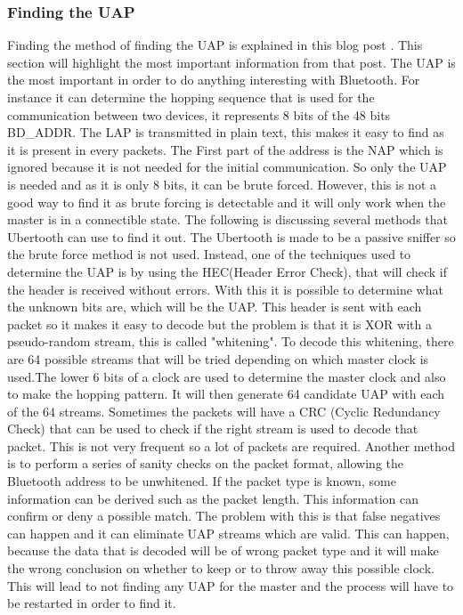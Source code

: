 \subsubsection{Finding the UAP}
\label{subsubsec:finding_uap}
Finding the method of finding the UAP is explained in this blog post \cite{discoveruap}. This section will highlight the most important information from that post. \pend The UAP is the most important in order to do anything interesting with Bluetooth. For instance it can determine the hopping sequence that is used for the communication between two devices, it represents 8 bits of the 48 bits BD\_ADDR. The LAP is transmitted in plain text, this makes it easy to find as it is present in every packets. The First part of the address is the NAP which is ignored because it is not needed for the initial communication. So only the UAP is needed and as it is only 8 bits, it can be brute forced. However, this is not a good way to find it as brute forcing is detectable and it will only work when the master is in a connectible state. The following is discussing several methods that Ubertooth can use to find it out.\pend
The Ubertooth is made to be a passive sniffer so the brute force method is not used. Instead, one of the techniques used to determine the UAP is by using the HEC(Header Error Check), that will check if the header is received without errors. With this it is possible to determine what the unknown bits are, which will be the UAP. This header is sent with each packet so it makes it easy to decode but the problem is that it is XOR with a pseudo-random stream, this is called "whitening". 
To decode this whitening, there are 64 possible streams that will be tried depending on which master clock is used.\pend The lower 6 bits of a clock are used to determine the master clock and also to make the hopping pattern. It will then generate 64 candidate UAP with each of the 64 streams. Sometimes the packets will have a CRC (Cyclic Redundancy Check) that can be used to check if the right stream is used to decode that packet. This is not very frequent so a lot of packets are required.\pend
Another method is to perform a series of sanity checks on the packet format, allowing the Bluetooth address to be unwhitened. If the packet type is known, some information can be derived such as the packet length. This information can confirm or deny a possible match. The problem with this is that false negatives can happen and it can eliminate UAP streams which are valid. This can happen, because the data that is decoded will be of wrong packet type and it will make the wrong conclusion on whether to keep or to throw away this possible clock. This will lead to not finding any UAP for the master and the process will have to be restarted in order to find it. \pend


